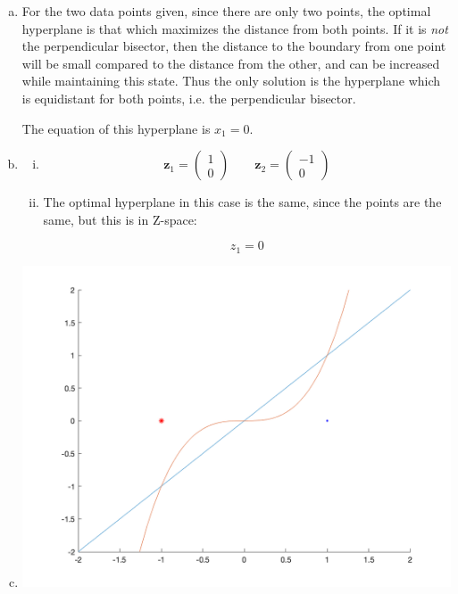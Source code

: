 \documentclass{article}
\renewcommand{\vec}[1]{\mathbf{#1}}
\begin{document}
\begin{enumerate}[(a)]
  \item \textit{}

    For the two data points given, since there are only two points, the optimal hyperplane is 
    that which maximizes the distance from both points. If it is \textit{not} the perpendicular
    bisector, then the distance to the boundary from one point will be small compared to the
    distance from the other, and can be increased while maintaining this state. Thus the only
    solution is the hyperplane which is equidistant for both points, i.e. the perpendicular 
    bisector.

    The equation of this hyperplane is $x_1 = 0$.

  \item \textit{}

    \begin{enumerate}[i.]
      \item \textit{}

        \[ \mathbf{z}_1 =
        \begin{pmatrix} 1 \\ 0 \end{pmatrix}
          \qquad
          \vec{z}_2 = 
          \begin{pmatrix} -1 \\ 0 \end{pmatrix}
            \]

      \item \textit{}

        The optimal hyperplane in this case is the same, since the points are the same, but this
        is in Z-space:

        $$z_1 = 0$$


    \end{enumerate}

  \item \textit{}

    \includegraphics[width=.5\textwidth]{svmeasy.png}


\end{enumerate}
\end{document}

